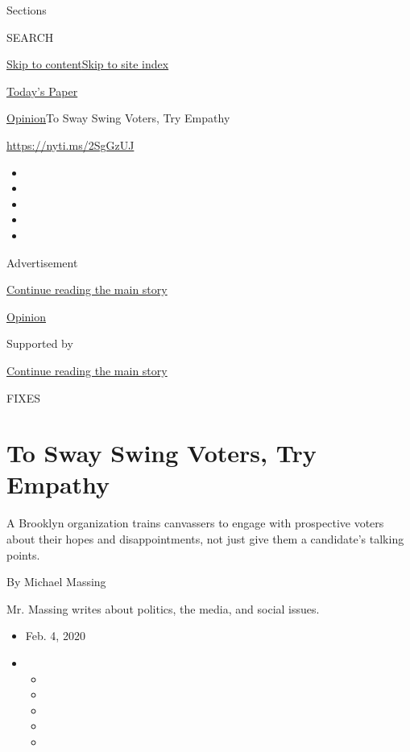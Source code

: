 Sections

SEARCH

\protect\hyperlink{site-content}{Skip to
content}\protect\hyperlink{site-index}{Skip to site index}

\href{https://myaccount.nytimes.com/auth/login?response_type=cookie\&client_id=vi}{}

\href{https://www.nytimes.com/section/todayspaper}{Today's Paper}

\href{/section/opinion}{Opinion}\textbar{}To Sway Swing Voters, Try
Empathy

\href{https://nyti.ms/2SgGzUJ}{https://nyti.ms/2SgGzUJ}

\begin{itemize}
\item
\item
\item
\item
\item
\end{itemize}

Advertisement

\protect\hyperlink{after-top}{Continue reading the main story}

\href{/section/opinion}{Opinion}

Supported by

\protect\hyperlink{after-sponsor}{Continue reading the main story}

FIXES

\hypertarget{to-sway-swing-voters-try-empathy}{%
\section{To Sway Swing Voters, Try
Empathy}\label{to-sway-swing-voters-try-empathy}}

A Brooklyn organization trains canvassers to engage with prospective
voters about their hopes and disappointments, not just give them a
candidate's talking points.

By Michael Massing

Mr. Massing writes about politics, the media, and social issues.

\begin{itemize}
\item
  Feb. 4, 2020
\item
  \begin{itemize}
  \item
  \item
  \item
  \item
  \item
  \end{itemize}
\end{itemize}

